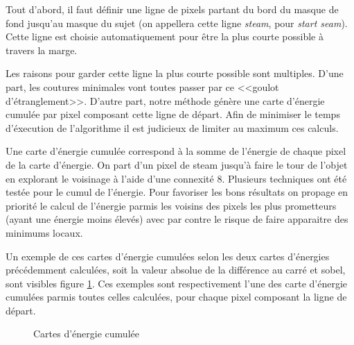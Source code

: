 \documentclass[a4paper]{article}
\begin{document}
Tout d'abord, il faut définir une ligne de pixels partant du bord du masque de fond jusqu'au masque du sujet (on appellera
cette ligne {\em steam}, pour {\em start seam}). %
Cette ligne est choisie automatiquement pour être la plus courte possible à travers la marge.

Les raisons pour garder cette ligne la plus courte possible sont multiples. D'une part, les coutures minimales
vont toutes passer par ce <<goulot d'étranglement>>. D'autre part, notre méthode génère une carte d'énergie
cumulée par pixel composant cette ligne de départ. Afin de minimiser le temps d'éxecution de l'algorithme il
est judicieux de limiter au maximum ces calculs.

Une carte d’énergie cumulée correspond à la somme de l'énergie de chaque pixel de la carte d'énergie. 
On part d’un pixel de steam jusqu’à faire le tour de l’objet en explorant le voisinage à l'aide d'une connexité 8.
Plusieurs techniques ont été testée pour le cumul de l'énergie. Pour favoriser les bons résultats on propage
en priorité le calcul de l'énergie parmis les voisins des pixels les plus prometteurs (ayant une énergie moins élevés) 
avec par contre le risque de faire apparaitre des minimums locaux.

Un exemple de ces cartes d'énergie cumulées selon les deux cartes d'énergies précédemment calculées, soit la
valeur absolue de la différence au carré et sobel, sont visibles figure \ref{ecum}. Ces exemples sont
respectivement l'une des carte d'énergie cumulées parmis toutes celles calculées, pour chaque pixel composant la ligne de départ.

\begin{figure}[!ht]%
    \centering
    \hspace{0.030\textwidth}
    \caption{Cartes d'énergie cumulée}
    \label{ecum}
\end{figure}
\end{document}
